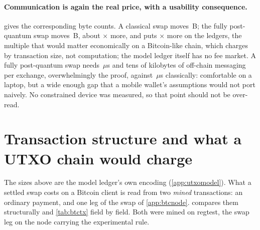 \paragraph{Communication is again the real price, with a usability consequence.}
 gives the corresponding byte counts. A
classical swap moves \cfgOneBytesTotal{}\,B; the fully post-quantum swap moves
\cfgThreeBytesTotal{}\,B, about \stageTwoBytesRatioThree{}$\times$ more, and puts
\stageTwoOnChainRatio{}$\times$ more on the ledgers, the multiple that would matter
economically on a Bitcoin-like chain, which charges by transaction size, not computation; the model ledger itself has no fee market. A fully post-quantum swap needs
\cfgThreeTotalMean{}\,$\mu$s and tens of kilobytes of off-chain messaging per exchange,
overwhelmingly the proof, against \cfgOneTotalMean{}\,$\mu$s classically: comfortable on
a laptop, but a wide enough gap that a mobile wallet's assumptions would not port
naively. No constrained device was measured, so that point should not be over-read.

\section{Transaction structure and what a UTXO chain would charge}
\label{sec:res-txstruct}

The sizes above are the model ledger's own encoding (\cref{app:utxomodel}). What a
settled swap costs on a Bitcoin client is read from two \emph{mined} transactions: an
ordinary payment, and one leg of the swap of \cref{app:btcnode}. 
compares them structurally and \cref{tab:btctx} field by field. Both were mined on
regtest, the swap leg on the node carrying the experimental rule.

